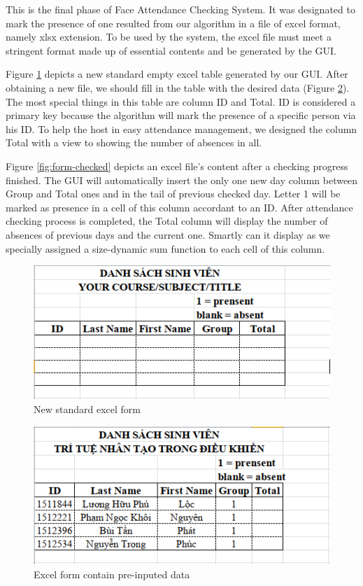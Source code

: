 \documentclass[journal, twocolumn]{IEEEtran}
\begin{document}
This is the final phase of Face Attendance Checking System.
It was designated to mark the presence of one resulted from
our algorithm in a file of excel format, namely xlsx extension.
To be used by the system, the excel file must meet
a stringent format made up of essential contents and be
generated by the GUI. 

Figure \ref{fig:form-new} depicts a new standard empty
excel table generated by our GUI. After obtaining a new file, we should fill in the table with the desired data (Figure \ref{fig:form-data}). The most special things in this table are column ID and Total. 
ID is considered a primary key because the algorithm will mark the presence of a specific person via his ID. 
To help the host in easy attendance management, we designed the column Total with a view to showing the number of absences in all.

Figure \ref{fig:form-checked} depicts an excel file's content after a checking progress finished. 
The GUI will automatically insert the only one new day column between Group and Total ones and in the tail of previous checked day. 
Letter 1 will be marked as presence in a cell of this column accordant to an ID. 
After attendance checking process is completed, the Total column will display the number of absences of previous days and the current one. Smartly can it display as we specially assigned a size-dynamic sum function to each cell of this column.


\begin{figure}
    \centering
    \includegraphics[width=0.8\linewidth]{img/form-new.png}
	\caption{New standard excel form}\label{fig:form-new}
\end{figure}

\begin{figure}
    \centering
    \includegraphics[width=0.8\linewidth]{img/form-data.png}
	\caption{Excel form contain pre-inputed data}\label{fig:form-data}
\end{figure}
\end{document}
